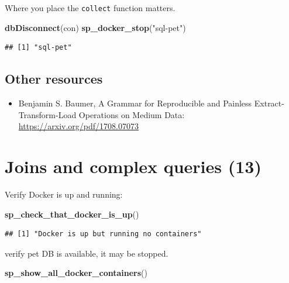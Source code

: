 \documentclass[]{book}
\newenvironment{Shaded}{\begin{snugshade}}{\end{snugshade}}
\newcommand{\KeywordTok}[1]{\textcolor[rgb]{0.13,0.29,0.53}{\textbf{#1}}}
\newcommand{\NormalTok}[1]{#1}
\newcommand{\StringTok}[1]{\textcolor[rgb]{0.31,0.60,0.02}{#1}}
\providecommand{\tightlist}{%
  \setlength{\itemsep}{0pt}\setlength{\parskip}{0pt}}
\theoremstyle{definition}
\theoremstyle{definition}
\theoremstyle{definition}
\theoremstyle{remark}
\begin{document}
Where you place the \texttt{collect} function matters.

\begin{Shaded}
\begin{Highlighting}[]
\KeywordTok{dbDisconnect}\NormalTok{(con)}
\KeywordTok{sp_docker_stop}\NormalTok{(}\StringTok{"sql-pet"}\NormalTok{)}
\end{Highlighting}
\end{Shaded}

\begin{verbatim}
## [1] "sql-pet"
\end{verbatim}

\hypertarget{other-resources}{%
\section{Other resources}\label{other-resources}}

\begin{itemize}
\tightlist
\item
  Benjamin S. Baumer, A Grammar for Reproducible and Painless
  Extract-Transform-Load Operations on Medium Data:
  \url{https://arxiv.org/pdf/1708.07073}
\end{itemize}

\hypertarget{joins-and-complex-queries-13}{%
\chapter{Joins and complex queries
(13)}\label{joins-and-complex-queries-13}}

Verify Docker is up and running:

\begin{Shaded}
\begin{Highlighting}[]
\KeywordTok{sp_check_that_docker_is_up}\NormalTok{()}
\end{Highlighting}
\end{Shaded}

\begin{verbatim}
## [1] "Docker is up but running no containers"
\end{verbatim}

verify pet DB is available, it may be stopped.

\begin{Shaded}
\begin{Highlighting}[]
\KeywordTok{sp_show_all_docker_containers}\NormalTok{()}
\end{Highlighting}
\end{Shaded}
\end{document}
